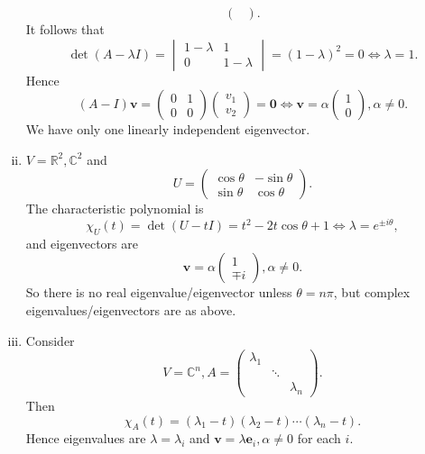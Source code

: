 \documentclass[a4paper]{article}
\begin{document}
\begin{example}
\begin{enumerate}[(i)]
\[\begin{pmatrix}
            \end{pmatrix}
          .\]
          It follows that
          \[
            \det (A-\lambda I)=
            \begin{vmatrix}
              1-\lambda& 1\\0& 1-\lambda
            \end{vmatrix}=(1-\lambda)^2=0 \Longleftrightarrow \lambda=1
          .\]
          Hence
          \[
            (A-I)\mathbf{v}=
            \begin{pmatrix}
              0&1\\0&0
            \end{pmatrix}
            \begin{pmatrix}
              v_1\\v_2
            \end{pmatrix}=\mathbf{0} \Longleftrightarrow \mathbf{v}=\alpha
            \begin{pmatrix}
              1\\0
            \end{pmatrix}, \alpha\neq 0
          .\]
          We have only one linearly independent eigenvector.
        \item $ V=\mathbb{R}^2, \mathbb{C}^{2} $ and
          \[
            U =
            \begin{pmatrix}
              \cos \theta&-\sin \theta\\
              \sin \theta&\cos \theta
            \end{pmatrix}
          .\]
          The characteristic polynomial is
          \[
            \chi_U(t)=\det (U-tI)=t^2-2t \cos \theta+1
            \Leftrightarrow \lambda=e^{\pm i\theta}
          ,\]
          and eigenvectors are
          \[
            \mathbf{v}=\alpha
            \begin{pmatrix}
              1\\\mp i
            \end{pmatrix}, \alpha\neq 0
          .\]
          So there is no real eigenvalue/eigenvector unless $
          \theta=n\pi $, but complex eigenvalues/eigenvectors are as above.
        \item Consider
          \[
            V=\mathbb{C}^{n}, A=
            \begin{pmatrix}
              \lambda_1&&\\
              &\ddots&\\
              &&\lambda_n
            \end{pmatrix}
          .\]
          Then
          \[
            \chi_A(t)=(\lambda_1-t)(\lambda_2-t)\cdots (\lambda_n-t)
          .\]
          Hence eigenvalues are $ \lambda=\lambda_i $ and $
          \mathbf{v}=\lambda\mathbf{e}_i, \alpha\neq 0 $ for each $i$.
      \end{enumerate}
    \end{example}
\end{document}
